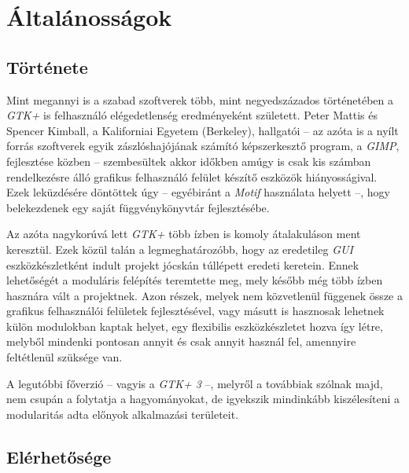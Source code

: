 \section{Általánosságok}

\subsection{Története}

Mint megannyi is a szabad szoftverek több, mint negyedszázados történetében a \textit{GTK+} is felhasználó elégedetlenség eredményeként született. Peter Mattis és Spencer Kimball, a Kaliforniai Egyetem (Berkeley), hallgatói -- az azóta is a nyílt forrás szoftverek egyik zászlóshajójának számító képszerkesztő program, a \textit{GIMP}, fejlesztése közben -- szembesültek akkor időkben amúgy is csak kis számban rendelkezésre álló grafikus felhasználó felület készítő eszközök hiányosságival. Ezek leküzdésére döntöttek úgy -- egyébiránt a \textit{Motif} használata helyett --, hogy belekezdenek egy saját függvénykönyvtár fejlesztésébe.

Az azóta nagykorúvá lett \textit{GTK+} több ízben is komoly átalakuláson ment keresztül. Ezek közül talán a legmeghatározóbb, hogy az eredetileg \textit{GUI} eszközkészletként indult projekt jócskán túllépett eredeti keretein. Ennek lehetőségét a moduláris felépítés teremtette meg, mely később még több ízben hasznára vált a projektnek. Azon részek, melyek nem közvetlenül függenek össze a grafikus felhasználói felületek fejlesztésével, vagy másutt is hasznosak lehetnek külön modulokban kaptak helyet, egy flexibilis eszközkészletet hozva így létre, melyből mindenki pontosan annyit és csak annyit használ fel, amennyire feltétlenül szüksége van.

A legutóbbi főverzió -- vagyis a \textit{GTK+ 3} --, melyről a továbbiak szólnak majd, nem csupán a folytatja a hagyományokat, de igyekszik mindinkább kiszélesíteni a modularitás adta előnyok alkalmazási területeit.

\subsection{Elérhetősége}


